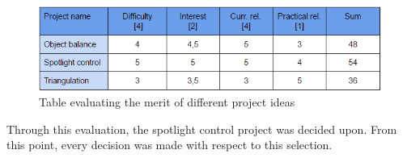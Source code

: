 \begin{figure}[h!]
\centering
\includegraphics[scale=0.7]{Billeder/IDEA_WEIGHT.png}
\caption{Table evaluating the merit of different project ideas}
\label{fig:ProjectEvaluation}
\end{figure}

Through this evaluation, the spotlight control project was decided upon. From this point, every decision was made with respect to this selection.